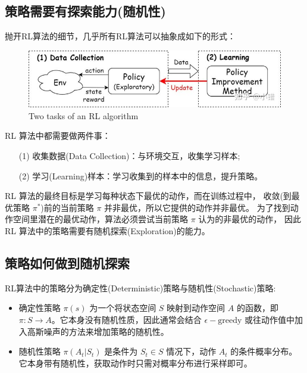 \subsection{策略需要有探索能力(随机性)}

抛开RL算法的细节，几乎所有RL算法可以抽象成如下的形式：
\begin{figure}[!htb]
\centering
\includegraphics[scale=0.5]{pix/exploration.jpg}
\caption{Two tasks of an RL algorithm}
\end{figure}

RL 算法中都需要做两件事：
\begin{itemize}
\setlength{\parskip}{0pt}
\item[(1)]
收集数据(Data Collection)：与环境交互，收集学习样本; 
\item[(2)]
学习(Learning)样本：学习收集到的样本中的信息，提升策略。
\end{itemize}

RL 算法的最终目标是学习每种状态下最优的动作，而在训练过程中，
收敛(到最优策略 $\pi^*$)前的当前策略 $\pi$ 并非最优，所以它提供的动作并非最优。
为了找到动作空间里潜在的最优动作，算法必须尝试当前策略 $\pi$ 认为的非最优的动作，
因此 RL 算法中的策略需要有随机探索(Exploration)的能力。

\subsection{策略如何做到随机探索}

RL算法中的策略分为确定性(Deterministic)策略与随机性(Stochastic)策略:
\begin{itemize}
\setlength{\parskip}{0pt}
\item
确定性策略 $\pi(s)$ 为一个将状态空间 $S$ 映射到动作空间 $A$ 的函数，即 
$\pi : S \rightarrow A$。它本身没有随机性质，因此通常会结合 $\epsilon-\text{greedy}$ 
或往动作值中加入高斯噪声的方法来增加策略的随机性。
\item
随机性策略 $\pi(A_t | S_t)$ 是条件为 $S_t \in S$ 情况下，动作 $A_t$ 的条件概率分布。
它本身带有随机性，获取动作时只需对概率分布进行采样即可。
\end{itemize}

